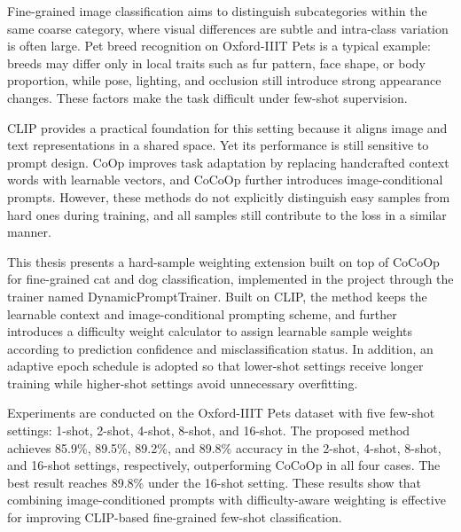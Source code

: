\begin{abstractEN}

Fine-grained image classification aims to distinguish subcategories within the same coarse category, where visual differences are subtle and intra-class variation is often large. Pet breed recognition on Oxford-IIIT Pets is a typical example: breeds may differ only in local traits such as fur pattern, face shape, or body proportion, while pose, lighting, and occlusion still introduce strong appearance changes. These factors make the task difficult under few-shot supervision.

CLIP provides a practical foundation for this setting because it aligns image and text representations in a shared space. Yet its performance is still sensitive to prompt design. CoOp improves task adaptation by replacing handcrafted context words with learnable vectors, and CoCoOp further introduces image-conditional prompts. However, these methods do not explicitly distinguish easy samples from hard ones during training, and all samples still contribute to the loss in a similar manner.

This thesis presents a hard-sample weighting extension built on top of CoCoOp for fine-grained cat and dog classification, implemented in the project through the trainer named DynamicPromptTrainer. Built on CLIP, the method keeps the learnable context and image-conditional prompting scheme, and further introduces a difficulty weight calculator to assign learnable sample weights according to prediction confidence and misclassification status. In addition, an adaptive epoch schedule is adopted so that lower-shot settings receive longer training while higher-shot settings avoid unnecessary overfitting.

Experiments are conducted on the Oxford-IIIT Pets dataset with five few-shot settings: 1-shot, 2-shot, 4-shot, 8-shot, and 16-shot. The proposed method achieves 85.9\%, 89.5\%, 89.2\%, and 89.8\% accuracy in the 2-shot, 4-shot, 8-shot, and 16-shot settings, respectively, outperforming CoCoOp in all four cases. The best result reaches 89.8\% under the 16-shot setting. These results show that combining image-conditioned prompts with difficulty-aware weighting is effective for improving CLIP-based fine-grained few-shot classification.

\end{abstractEN}
